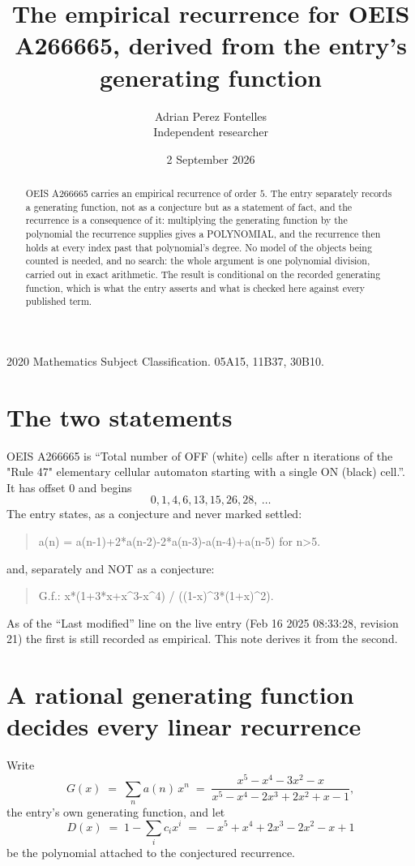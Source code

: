 \documentclass[11pt,a4paper]{article}
\title{The empirical recurrence for OEIS A266665, derived from the entry's generating function}
\author{Adrian Perez Fontelles\\ \small Independent researcher}
\date{2 September 2026}
\theoremstyle{plain}
\theoremstyle{definition}
\begin{document}
\maketitle

\begin{abstract}
OEIS A266665 carries an empirical recurrence of order $5$. The entry separately records a
generating function, not as a conjecture but as a statement of fact, and the recurrence is a
consequence of it: multiplying the generating function by the polynomial the recurrence
supplies gives a POLYNOMIAL, and the recurrence then holds at every index past that
polynomial's degree. No model of the objects being counted is needed, and no search: the
whole argument is one polynomial division, carried out in exact arithmetic. The result is
conditional on the recorded generating function, which is what the entry asserts and what is
checked here against every published term.
\end{abstract}

\noindent\small 2020 Mathematics Subject Classification. 05A15, 11B37, 30B10.\normalsize

\section{The two statements}

OEIS A266665 is ``Total number of OFF (white) cells after n iterations of the "Rule 47" elementary cellular automaton starting with a single ON (black) cell.''. It has offset $0$ and begins
\[
0, 1, 4, 6, 13, 15, 26, 28,\ \dots
\]
The entry states, as a conjecture and never marked settled:
\begin{quote}
a(n) = a(n-1)+2*a(n-2)-2*a(n-3)-a(n-4)+a(n-5) for n>5.
\end{quote}
and, separately and NOT as a conjecture:
\begin{quote}
G.f.: x*(1+3*x+x\^{}3-x\^{}4) / ((1-x)\^{}3*(1+x)\^{}2).
\end{quote}
As of the ``Last modified'' line on the live entry (Feb 16 2025 08:33:28, revision 21) the first is still
recorded as empirical. This note derives it from the second.

\section{A rational generating function decides every linear recurrence}

Write
\[
G(x)\;=\;\sum_{n}a(n)\,x^{n}\;=\;\frac{x^{5} - x^{4} - 3 x^{2} - x}{x^{5} - x^{4} - 2 x^{3} + 2 x^{2} + x - 1},
\]
the entry's own generating function, and let
\[
D(x)\;=\;1-\sum_i c_i x^{i}\;=\;- x^{5} + x^{4} + 2 x^{3} - 2 x^{2} - x + 1
\]
be the polynomial attached to the conjectured recurrence.
\end{document}
